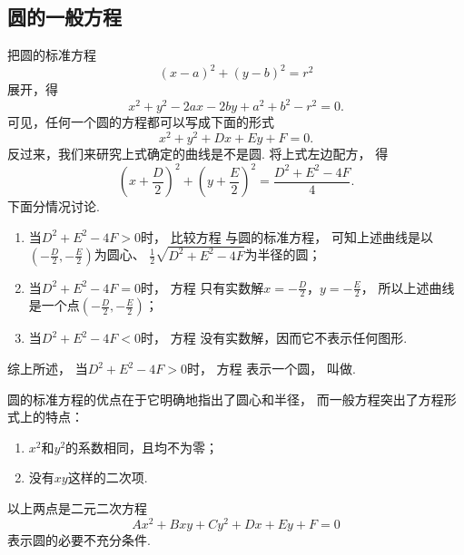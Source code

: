 \subsection{圆的一般方程}
把圆的标准方程\begin{equation*}
	(x-a)^2 + (y-b)^2 = r^2
\end{equation*}
展开，得\begin{equation*}
	x^2 + y^2 - 2ax - 2by + a^2 + b^2 - r^2 = 0.
\end{equation*}
可见，任何一个圆的方程都可以写成下面的形式\begin{equation}\label{equation:平面解析几何.圆的一般方程}
	x^2 + y^2 + Dx + Ey + F = 0.
\end{equation}
反过来，我们来研究上式确定的曲线是不是圆.
将上式左边配方，
得\begin{equation}\label{equation:平面解析几何.圆的一般方程.配方后}
	\left(x+\frac{D}{2}\right)^2+\left(y+\frac{E}{2}\right)^2 = \frac{D^2+E^2-4F}{4}.
\end{equation}
下面分情况讨论.
\begin{enumerate}
	\item 当\(D^2+E^2-4F > 0\)时，
	比较方程  与圆的标准方程，
	可知上述曲线是以\((-\frac{D}{2},-\frac{E}{2})\)为圆心、
	\(\frac{1}{2} \sqrt{D^2+E^2-4F}\)为半径的圆；

	\item 当\(D^2+E^2-4F = 0\)时，
	方程  只有实数解\(x=-\frac{D}{2}\)，\(y=-\frac{E}{2}\)，
	所以上述曲线是一个点\((-\frac{D}{2},-\frac{E}{2})\)；

	\item 当\(D^2+E^2-4F < 0\)时，
	方程  没有实数解，因而它不表示任何图形.
\end{enumerate}
综上所述，
当\(D^2+E^2-4F > 0\)时，
方程  表示一个圆，
叫做.

圆的标准方程的优点在于它明确地指出了圆心和半径，
而一般方程突出了方程形式上的特点：\begin{enumerate}
	\item \(x^2\)和\(y^2\)的系数相同，且均不为零；
	\item 没有\(xy\)这样的二次项.
\end{enumerate}
以上两点是二元二次方程\begin{equation*}
	A x^2 + B xy + C y^2 + D x + E y + F = 0
\end{equation*}
表示圆的必要不充分条件.

